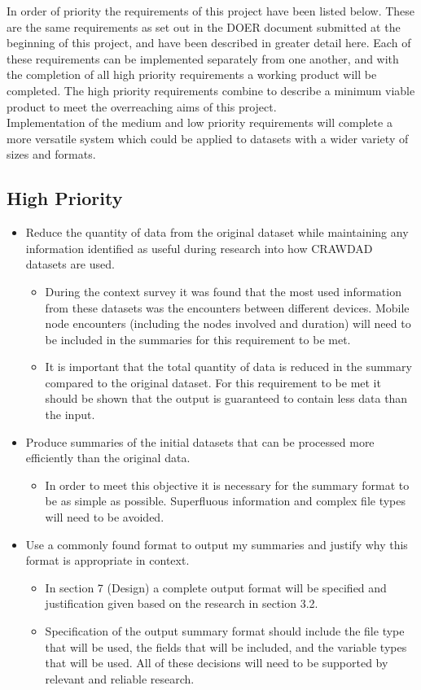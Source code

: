 In order of priority the requirements of this project have been listed below. These are the same requirements as set out in the DOER document submitted at the beginning of this project, and have been described in greater detail here. Each of these requirements can be implemented separately from one another, and with the completion of all high priority requirements a working product will be completed. The high priority requirements combine to describe a minimum viable product to meet the overreaching aims of this project. \\
Implementation of the medium and low priority requirements will complete a more versatile system which could be applied to datasets with a wider variety of sizes and formats.\\

\subsection{High Priority}
\begin{itemize}
    \item Reduce the quantity of data from the original dataset while maintaining any information identified as useful during research into how CRAWDAD datasets are used.
    \begin{itemize}
        \item During the context survey it was found that the most used information from these datasets was the encounters between different devices. Mobile node encounters (including the nodes involved and duration) will need to be included in the summaries for this requirement to be met. 
        \item It is important that the total quantity of data is reduced in the summary compared to the original dataset. For this requirement to be met it should be shown that the output is guaranteed to contain less data than the input.
    \end{itemize}
    \item Produce summaries of the initial datasets that can be processed more efficiently than the original data.
    \begin{itemize}
        \item In order to meet this objective it is necessary for the summary format to be as simple as possible. Superfluous information and complex file types will need to be avoided. 
    \end{itemize}
    \item Use a commonly found format to output my summaries and justify why this format is appropriate in context.
    \begin{itemize}
        \item In section 7 (Design) a complete output format will be specified and justification given based on the research in section 3.2.
        \item Specification of the output summary format should include the file type that will be used, the fields that will be included, and the variable types that will be used. All of these decisions will need to be supported by relevant and reliable research.
    \end{itemize}
\end{itemize}

